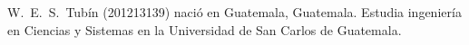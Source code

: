 \documentclass[journal]{../../IEEEtran/IEEEtran}
\begin{document}
% 


\begin{IEEEbiographynophoto}{W.~E.~S.~Tubín (201213139)}
nació en Guatemala, Guatemala. Estudia ingeniería en Ciencias y
Sistemas en la Universidad de San Carlos de Guatemala.
\end{IEEEbiographynophoto}





\vfill




\end{document}
